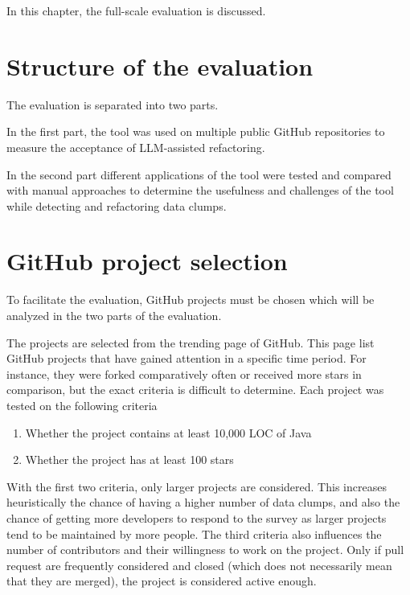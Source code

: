
In this chapter, the full-scale evaluation is discussed.
\section{Structure of the evaluation}

The evaluation is separated into two parts.

In the first part, the tool was used on multiple public GitHub repositories to measure the acceptance of \ac{LLM}-assisted refactoring.

In the second part different applications of the tool were tested and compared with manual approaches to determine the usefulness and challenges of the tool while detecting and refactoring data clumps.





\section{GitHub project selection}\label{sec:github_projects}

To facilitate the evaluation, GitHub projects must be chosen which will be analyzed in the two parts of the evaluation. 


The projects are selected from the trending page of GitHub. This page list GitHub projects that have gained attention in a specific time period. For instance, they were forked comparatively often or received more stars in comparison, but the exact criteria is difficult to determine. Each project was tested on the following criteria
\begin{enumerate}
    \item Whether the project contains at least  10,000 \ac{LOC} of Java
        \item Whether the project  has at least 100 stars

\end{enumerate}

With the first two criteria,  only larger projects are considered. This increases heuristically the chance of having a higher number of data clumps, and also the chance of getting more developers to respond to the survey as larger projects tend to be maintained by more people. The third criteria also influences the number of contributors and their willingness to work on the project. Only if pull request are frequently considered and closed (which does not necessarily mean that they are merged), the project is considered active enough. 


